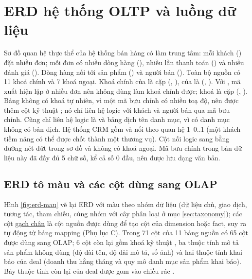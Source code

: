\section{ERD hệ thống OLTP và luồng dữ liệu}\label{sec:erd-oltp}
Sơ đồ quan hệ thực thể của hệ thống bán hàng có  làm trung tâm: mỗi khách () đặt nhiều đơn; mỗi đơn có nhiều dòng hàng (), nhiều lần thanh toán () và nhiều đánh giá (). Dòng hàng nối tới sản phẩm () và người bán (). Toàn bộ nguồn có 11 khoá chính và 7 khoá ngoại. Khoá chính của  là cặp (, ), của  là (, ). Với , mã  xuất hiện lặp ở nhiều đơn nên không dùng làm khoá chính được; khoá là cặp (, ). Bảng  không có khoá tự nhiên, vì một mã bưu chính có nhiều toạ độ, nên được thêm cột kỹ thuật ; nó chỉ liên hệ logic với khách và người bán qua mã bưu chính. Cũng chỉ liên hệ logic là  và bảng dịch tên danh mục, vì có danh mục không có bản dịch. Hệ thống CRM gồm  và  nối theo quan hệ 1–0..1 (một khách tiềm năng có thể được chốt thành một thương vụ). Cột  nối logic sang  bằng đường nét đứt trong sơ đồ và không có khoá ngoại. Mã bưu chính trong bản dữ liệu này đã đầy đủ 5 chữ số, kể cả số 0 đầu, nên được lưu dạng văn bản.


\subsection{ERD tô màu và các cột dùng sang OLAP}\label{sec:erd-mau}
Hình \ref{fig:erd-mau} vẽ lại ERD với màu theo nhóm dữ liệu (dữ liệu chủ, giao dịch, tương tác, tham chiếu, cùng nhóm với cây phân loại ở mục \ref{sec:taxonomy}); các cột \underline{gạch chân} là cột nguồn được dùng để tạo cột của dimension hoặc fact, suy ra tự động từ bảng mapping (Phụ lục C). Trong 71 cột của 11 bảng nguồn có 65 cột được dùng sang OLAP; 6 cột còn lại gồm khoá kỹ thuật , ba thuộc tính mô tả sản phẩm không dùng (độ dài tên, độ dài mô tả, số ảnh) và hai thuộc tính khai báo của deal (doanh thu hằng tháng và quy mô danh mục sản phẩm khai báo). Bảy thuộc tính còn lại của deal được gom vào chiều rác .


